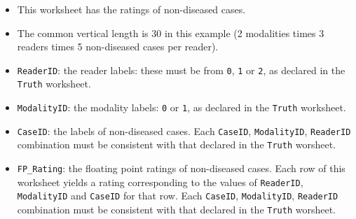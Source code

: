 \documentclass[
]{book}
\newenvironment{Shaded}{\begin{snugshade}}{\end{snugshade}}
\newcommand{\CommentTok}[1]{\textcolor[rgb]{0.56,0.35,0.01}{\textit{#1}}}
\newcommand{\DecValTok}[1]{\textcolor[rgb]{0.00,0.00,0.81}{#1}}
\newcommand{\NormalTok}[1]{#1}
\newcommand{\OperatorTok}[1]{\textcolor[rgb]{0.81,0.36,0.00}{\textbf{#1}}}
\providecommand{\tightlist}{%
  \setlength{\itemsep}{0pt}\setlength{\parskip}{0pt}}
\begin{document}
\begin{itemize}
\tightlist
\item
  This worksheet has the ratings of non-diseased cases.
\item
  The common vertical length is 30 in this example (2 modalities times 3 readers times 5 non-diseased cases per reader).
\item
  \texttt{ReaderID}: the reader labels: these must be from \texttt{0}, \texttt{1} or \texttt{2}, as declared in the \texttt{Truth} worksheet.
\item
  \texttt{ModalityID}: the modality labels: \texttt{0} or \texttt{1}, as declared in the \texttt{Truth} worksheet.
\item
  \texttt{CaseID}: the labels of non-diseased cases. Each \texttt{CaseID}, \texttt{ModalityID}, \texttt{ReaderID} combination must be consistent with that declared in the \texttt{Truth} worsheet.\\
\item
  \texttt{FP\_Rating}: the floating point ratings of non-diseased cases. Each row of this worksheet yields a rating corresponding to the values of \texttt{ReaderID}, \texttt{ModalityID} and \texttt{CaseID} for that row. Each \texttt{CaseID}, \texttt{ModalityID}, \texttt{ReaderID} combination must be consistent with that declared in the \texttt{Truth} worsheet.
\end{itemize}

\begin{Shaded}
\end{Shaded}
\end{document}
